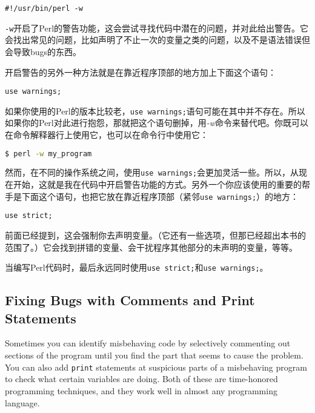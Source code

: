 \begin{lstlisting}
#!/usr/bin/perl -w
\end{lstlisting}

\verb|-w|开启了Perl的警告功能，这会尝试寻找代码中潜在的问题，并对此给出警告。它会找出常见的问题，比如声明了不止一次的变量之类的问题，以及不是语法错误但会导致bugs的东西。

开启警告的另外一种方法就是在靠近程序顶部的地方加上下面这个语句：

\begin{lstlisting}
use warnings;
\end{lstlisting}

如果你使用的Perl的版本比较老，\verb|use warnings;|语句可能在其中并不存在。所以如果你的Perl对此进行抱怨，那就把这个语句删掉，用\textit{-w}命令来替代吧。你既可以在命令解释器行上使用它，也可以在命令行中使用它：

\begin{lstlisting}[language=bash]
$ perl -w my_program
\end{lstlisting}

然而，在不同的操作系统之间，使用\verb|use warnings;|会更加灵活一些。所以，从现在开始，这就是我在代码中开启警告功能的方式。另外一个你应该使用的重要的帮手是下面这个语句，也把它放在靠近程序顶部（紧邻\verb|use warnings;|）的地方：

\begin{lstlisting}
use strict;
\end{lstlisting}

前面已经提到，这会强制你去声明变量。（它还有一些选项，但那已经超出本书的范围了。）它会找到拼错的变量、会干扰程序其他部分的未声明的变量，等等。

\begin{adjustwidth}{2cm}{2cm}
  \noindent
当编写Perl代码时，最后永远同时使用\verb|use strict;|和\verb|use warnings;|。
\end{adjustwidth}

\subsection{Fixing Bugs with Comments and Print Statements}
Sometimes you can identify misbehaving code by selectively commenting out sections of the program until you find the part that seems to cause the problem. You can also add \verb|print| statements at suspicious parts of a misbehaving program to check what certain variables are doing. Both of these are time-honored programming techniques, and they work well in almost any programming language.

